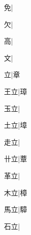 \begin{multicols}{2}
{{\cjk{}{\cnsym{}　}{\cnsym{}　}免}\mktsJzrVerticalBar{}{\cjk{}{\cnsym{}　}{\cnsym{}　}{\cnsym{}　}}|{}\par
{欠}\mktsJzrVerticalBar{}{\cjk{}{\cnsym{}　}{\cnsym{}　}{\cnsym{}　}}|{}\par
{\cjk{}{\cnsym{}　}{\cnsym{}　}高}\mktsJzrVerticalBar{}{\cjk{}{\cnsym{}　}{\cnsym{}　}{\cnsym{}　}}|{}\par
{\cjk{}{\cnsym{}　}{\cnsym{}　}文}\mktsJzrVerticalBar{}{\cjk{}{\cnsym{}　}{\cnsym{}　}{\cnsym{}　}}|{}\par
{\cjk{}{\cnsym{}　}{\cnsym{}　}立}\mktsJzrVerticalBar{}{\cjk{}{\cnsym{}　}{\cnsym{}　}{\cnsym{}　}}|{\cjk{}章}\par
{\cjk{}{\cnsym{}　}王立}\mktsJzrVerticalBar{}{\cjk{}{\cnsym{}　}{\cnsym{}　}{\cnsym{}　}}|{\cjk{}璋}\par
{\cjk{}{\cnsym{}　}玉立}\mktsJzrVerticalBar{}{\cjk{}{\cnsym{}　}{\cnsym{}　}{\cnsym{}　}}|{}\par
{\cjk{}{\cnsym{}　}土立}\mktsJzrVerticalBar{}{\cjk{}{\cnsym{}　}{\cnsym{}　}{\cnsym{}　}}|{\cjk{}墇}\par
{\cjk{}{\cnsym{}　}走立}\mktsJzrVerticalBar{}{\cjk{}{\cnsym{}　}{\cnsym{}　}{\cnsym{}　}}|{}\par
{\cjk{}{\cnsym{}　}卄立}\mktsJzrVerticalBar{}{\cjk{}{\cnsym{}　}{\cnsym{}　}{\cnsym{}　}}|{\cjk{}蔁}\par
{\cjk{}{\cnsym{}　}革立}\mktsJzrVerticalBar{}{\cjk{}{\cnsym{}　}{\cnsym{}　}{\cnsym{}　}}|{}\par
{\cjk{}{\cnsym{}　}木立}\mktsJzrVerticalBar{}{\cjk{}{\cnsym{}　}{\cnsym{}　}{\cnsym{}　}}|{\cjk{}樟}\par
{\cjk{}{\cnsym{}　}馬立}\mktsJzrVerticalBar{}{\cjk{}{\cnsym{}　}{\cnsym{}　}{\cnsym{}　}}|{\cjk{}騿}\par
{\cjk{}{\cnsym{}　}石立}\mktsJzrVerticalBar{}{\cjk{}{\cnsym{}　}{\cnsym{}　}{\cnsym{}　}}|{}\par
}
\end{multicols}
